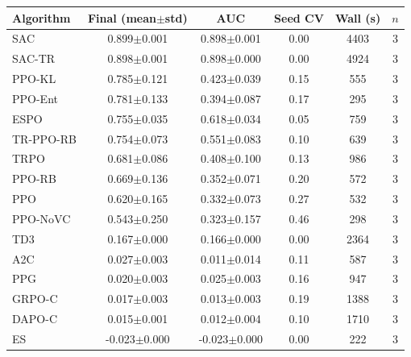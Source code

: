 \begin{tabular}{lccccc}
\toprule
Algorithm & Final (mean$\pm$std) & AUC & Seed CV & Wall (s) & $n$ \\
\midrule
SAC & 0.899$\pm$0.001 & 0.898$\pm$0.001 & 0.00 & 4403 & 3 \\
SAC-TR & 0.898$\pm$0.001 & 0.898$\pm$0.000 & 0.00 & 4924 & 3 \\
PPO-KL & 0.785$\pm$0.121 & 0.423$\pm$0.039 & 0.15 & 555 & 3 \\
PPO-Ent & 0.781$\pm$0.133 & 0.394$\pm$0.087 & 0.17 & 295 & 3 \\
ESPO & 0.755$\pm$0.035 & 0.618$\pm$0.034 & 0.05 & 759 & 3 \\
TR-PPO-RB & 0.754$\pm$0.073 & 0.551$\pm$0.083 & 0.10 & 639 & 3 \\
TRPO & 0.681$\pm$0.086 & 0.408$\pm$0.100 & 0.13 & 986 & 3 \\
PPO-RB & 0.669$\pm$0.136 & 0.352$\pm$0.071 & 0.20 & 572 & 3 \\
PPO & 0.620$\pm$0.165 & 0.332$\pm$0.073 & 0.27 & 532 & 3 \\
PPO-NoVC & 0.543$\pm$0.250 & 0.323$\pm$0.157 & 0.46 & 298 & 3 \\
TD3 & 0.167$\pm$0.000 & 0.166$\pm$0.000 & 0.00 & 2364 & 3 \\
A2C & 0.027$\pm$0.003 & 0.011$\pm$0.014 & 0.11 & 587 & 3 \\
PPG & 0.020$\pm$0.003 & 0.025$\pm$0.003 & 0.16 & 947 & 3 \\
GRPO-C & 0.017$\pm$0.003 & 0.013$\pm$0.003 & 0.19 & 1388 & 3 \\
DAPO-C & 0.015$\pm$0.001 & 0.012$\pm$0.004 & 0.10 & 1710 & 3 \\
ES & -0.023$\pm$0.000 & -0.023$\pm$0.000 & 0.00 & 222 & 3 \\
\bottomrule
\end{tabular}
